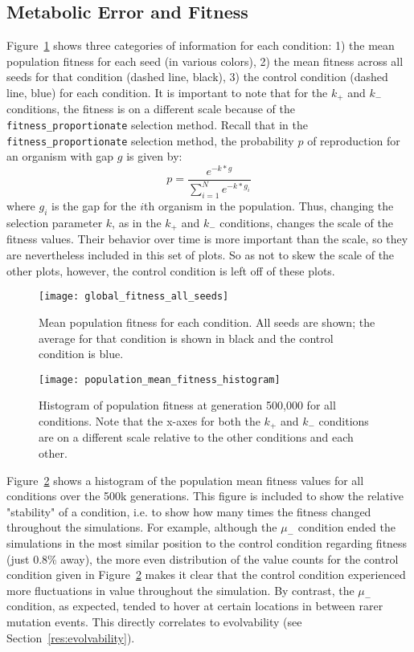 \subsection{Metabolic Error and Fitness}\label{res:metabolic_error_and_fitness}
Figure~\ref{fig:mean_fitness_all_seeds} shows three categories of information for each condition: 1) the mean population fitness for each seed (in various colors), 2) the mean fitness across all seeds for that condition (dashed line, black), 3) the control condition (dashed line, blue) for each condition. It is important to note that for the $k_+$ and $k_-$ conditions, the fitness is on a different scale because of the \texttt{fitness\_proportionate} selection method. Recall that in the \texttt{fitness\_proportionate} selection method, the probability $p$ of reproduction for an organism with gap $g$ is given by:
\begin{equation*}
p = \frac{e^{-k*g}}{\sum_{i=1}^{N}e^{-k*g_i}}
\end{equation*}
where $g_i$ is the gap for the $i$th organism in the population. Thus, changing the selection parameter $k$, as in the $k_+$ and $k_-$ conditions, changes the scale of the fitness values. Their behavior over time is more important than the scale, so they are nevertheless included in this set of plots. So as not to skew the scale of the other plots, however, the control condition is left off of these plots. 

\begin{figure}[H]
	\texttt{[image: global\_fitness\_all\_seeds]}
	\caption[Fitness all seeds all conditions]{Mean population fitness for each condition. All seeds are shown; the average for that condition is shown in black and the control condition is blue.}
	\label{fig:mean_fitness_all_seeds}
\end{figure}

\begin{figure}[H]
	\texttt{[image: population\_mean\_fitness\_histogram]}
	\caption[Mean fitness histogram]{Histogram of population fitness at generation 500,000 for all conditions. Note that the x-axes for both the $k_+$ and $k_-$ conditions are on a different scale relative to the other conditions and each other.}
	\label{fig:global_fitness_histogram}
\end{figure}
Figure~\ref{fig:global_fitness_histogram} shows a histogram of the population mean fitness values for all conditions over the 500k generations. This figure is included to show the relative "stability" of a condition, i.e. to show how many times the fitness changed throughout the simulations. For example, although the $\mu_-$ condition ended the simulations in the most similar position to the control condition regarding fitness (just 0.8\% away), the more even distribution of the value counts for the control condition given in Figure~\ref{fig:global_fitness_histogram} makes it clear that the control condition experienced more fluctuations in value throughout the simulation. By contrast, the $\mu_-$ condition, as expected, tended to hover at certain locations in between rarer mutation events. This directly correlates to evolvability (see Section~\ref{res:evolvability}). 

